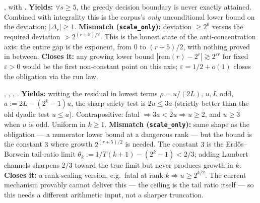 \begin{obs}[G5 / no-tie] 
, with
.
\textbf{Yields:} $\forall s \ge 5$, the greedy decision boundary is never exactly attained.
Combined with integrality this is the corpus's \emph{only} unconditional lower bound on the
deviation: $|\Delta_r| \ge 1$.
\textbf{Mismatch (\texttt{scale\_only}):} deviation $\ge 2^0$ versus the required deviation $>
2^{(r+5)/2}$. This is the honest state of the anti-concentration axis: the entire gap is the
exponent, from $0$ to $(r+5)/2$, with nothing proved in between.
\textbf{Closes it:} any growing lower bound $|\mathrm{rem}(r)-2^r| \gtrsim 2^{\varepsilon r}$ for
fixed $\varepsilon>0$ would be the first non-constant point on this axis; $\varepsilon = 1/2 +
o(1)$ closes the obligation via the run law.
\end{obs}

\begin{obs} 
,
,
,
.
\textbf{Yields:} writing the residual in lowest terms $\rho=u/(2L)$, $u,L$ odd, $a := 2L -
(2^k-1)u$, the sharp safety test is $2u \le 3a$ (strictly better than the old dyadic test $u \le
a$). Contrapositive: fatal $\Rightarrow 3a<2u \Rightarrow u \ge 2$, and $u \ge 3$ when $u$ is
odd. Uniform in $k \ge 1$.
\textbf{Mismatch (\texttt{scale\_only}):} same shape as the obligation — a numerator lower bound
at a dangerous rank — but the bound is the constant $3$ where growth $2^{(r+5)/2}$ is needed. The
constant $3$ is the Erdős--Borwein tail-ratio limit $\theta_k := 1/T(k+1)-(2^k-1) < 2/3$; adding
Lambert channels sharpens $2/3$ toward the true limit but never produces growth in $k$.
\textbf{Closes it:} a rank-scaling version, e.g.\ fatal at rank $k \Rightarrow u \ge 2^{k/2}$. The
current mechanism provably cannot deliver this — the ceiling is the tail ratio itself — so this
needs a different arithmetic input, not a sharper truncation.
\end{obs}

